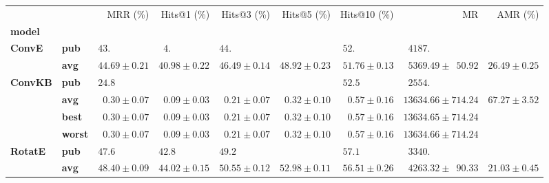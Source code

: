 \begin{tabular}{llrrrrrrr}
\toprule
       &     &                    MRR (\%) &                           Hits@1 (\%) &                 Hits@3 (\%) &                 Hits@5 (\%) &                Hits@10 (\%) &                                         MR &          AMR (\%) \\
\textbf{model} & {} &                             &                                       &                             &                             &                             &                                            &                   \\
\midrule
\textbf{ConvE} & \textbf{pub} &  $43.\phantom{00 \pm 0.00}$ &  $\phantom{0}4.\phantom{00 \pm 0.00}$ &  $44.\phantom{00 \pm 0.00}$ &                             &  $52.\phantom{00 \pm 0.00}$ &  $\phantom{0}4187.\phantom{00 \pm 000.00}$ &                   \\
       & \textbf{avg} &            $44.69 \pm 0.21$ &                      $40.98 \pm 0.22$ &            $46.49 \pm 0.14$ &            $48.92 \pm 0.23$ &            $51.76 \pm 0.13$ &  $\phantom{0}5369.49 \pm \phantom{0}50.92$ &  $26.49 \pm 0.25$ \\
\textbf{ConvKB} & \textbf{pub} &  $24.8\phantom{0 \pm 0.00}$ &                                       &                             &                             &  $52.5\phantom{0 \pm 0.00}$ &  $\phantom{0}2554.\phantom{00 \pm 000.00}$ &                   \\
       & \textbf{avg} &  $\phantom{0}0.30 \pm 0.07$ &            $\phantom{0}0.09 \pm 0.03$ &  $\phantom{0}0.21 \pm 0.07$ &  $\phantom{0}0.32 \pm 0.10$ &  $\phantom{0}0.57 \pm 0.16$ &                      $13634.66 \pm 714.24$ &  $67.27 \pm 3.52$ \\
       & \textbf{best} &  $\phantom{0}0.30 \pm 0.07$ &            $\phantom{0}0.09 \pm 0.03$ &  $\phantom{0}0.21 \pm 0.07$ &  $\phantom{0}0.32 \pm 0.10$ &  $\phantom{0}0.57 \pm 0.16$ &                      $13634.65 \pm 714.24$ &                   \\
       & \textbf{worst} &  $\phantom{0}0.30 \pm 0.07$ &            $\phantom{0}0.09 \pm 0.03$ &  $\phantom{0}0.21 \pm 0.07$ &  $\phantom{0}0.32 \pm 0.10$ &  $\phantom{0}0.57 \pm 0.16$ &                      $13634.66 \pm 714.24$ &                   \\
\textbf{RotatE} & \textbf{pub} &  $47.6\phantom{0 \pm 0.00}$ &            $42.8\phantom{0 \pm 0.00}$ &  $49.2\phantom{0 \pm 0.00}$ &                             &  $57.1\phantom{0 \pm 0.00}$ &  $\phantom{0}3340.\phantom{00 \pm 000.00}$ &                   \\
       & \textbf{avg} &            $48.40 \pm 0.09$ &                      $44.02 \pm 0.15$ &            $50.55 \pm 0.12$ &            $52.98 \pm 0.11$ &            $56.51 \pm 0.26$ &  $\phantom{0}4263.32 \pm \phantom{0}90.33$ &  $21.03 \pm 0.45$ \\
\bottomrule
\end{tabular}

